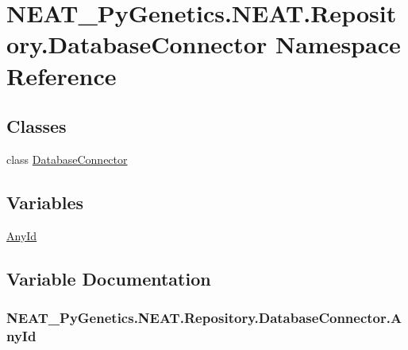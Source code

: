 \hypertarget{namespaceNEAT__PyGenetics_1_1NEAT_1_1Repository_1_1DatabaseConnector}{}\section{N\+E\+A\+T\+\_\+\+Py\+Genetics.\+N\+E\+A\+T.\+Repository.\+Database\+Connector Namespace Reference}
\label{namespaceNEAT__PyGenetics_1_1NEAT_1_1Repository_1_1DatabaseConnector}
\subsection*{Classes}
\begin{DoxyCompactItemize}
\item 
class \hyperlink{classNEAT__PyGenetics_1_1NEAT_1_1Repository_1_1DatabaseConnector_1_1DatabaseConnector}{Database\+Connector}
\end{DoxyCompactItemize}
\subsection*{Variables}
\begin{DoxyCompactItemize}
\item 
\hyperlink{namespaceNEAT__PyGenetics_1_1NEAT_1_1Repository_1_1DatabaseConnector_aa598d9ce8388d67320d5b2b902fced3a}{Any\+Id}
\end{DoxyCompactItemize}


\subsection{Variable Documentation}
\subsubsection[{\texorpdfstring{Any\+Id}{AnyId}}]{\setlength{\rightskip}{0pt plus 5cm}N\+E\+A\+T\+\_\+\+Py\+Genetics.\+N\+E\+A\+T.\+Repository.\+Database\+Connector.\+Any\+Id}\hypertarget{namespaceNEAT__PyGenetics_1_1NEAT_1_1Repository_1_1DatabaseConnector_aa598d9ce8388d67320d5b2b902fced3a}{}\label{namespaceNEAT__PyGenetics_1_1NEAT_1_1Repository_1_1DatabaseConnector_aa598d9ce8388d67320d5b2b902fced3a}
